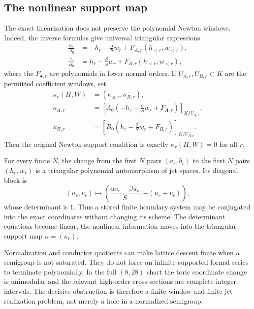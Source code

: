 \subsection{The nonlinear support map}

The exact linearization does not preserve the polynomial Newton windows.
Indeed, the inverse formulas give universal triangular expressions
\begin{align}
\frac{a_r}{A_0}
&=-h_r-\frac{\alpha}{S}w_r
+F_{A,r}(h_{<r},w_{<r}),\label{eq:support-map-A}\\
\frac{b_r}{B_0}
&=h_r-\frac{\beta}{S}w_r
+F_{B,r}(h_{<r},w_{<r}),\label{eq:support-map-B}
\end{align}
where the \(F_{\bullet,r}\) are polynomials in lower normal orders.
If \(U_{A,r},U_{B,r}\subset K\) are the permitted coefficient windows, set
\begin{equation}
\label{eq:support-kuranishi}
\begin{aligned}
\kappa_r(H,W)&=(\kappa_{A,r},\kappa_{B,r}),\\
\kappa_{A,r}
&=\left[
A_0\!\left(-h_r-\frac{\alpha}{S}w_r+F_{A,r}\right)
\right]_{K/U_{A,r}},\\
\kappa_{B,r}
&=\left[
B_0\!\left(h_r-\frac{\beta}{S}w_r+F_{B,r}\right)
\right]_{K/U_{B,r}}.
\end{aligned}
\end{equation}
Then the original Newton-support condition is exactly
\(\kappa_r(H,W)=0\) for all \(r\).

For every finite \(N\), the change from the first \(N\) pairs
\((a_r,b_r)\) to the first \(N\) pairs \((h_r,w_r)\) is a triangular
polynomial automorphism of jet spaces.  Its diagonal block is
\[
(u_r,v_r)\longmapsto
\left(\frac{\alpha v_r-\beta u_r}{S},-(u_r+v_r)\right),
\]
whose determinant is \(1\).  Thus a stored finite boundary system may be
conjugated into the exact coordinates without changing its scheme.  The
determinant equations become linear; the nonlinear information moves into
the triangular support map \(\kappa=(\kappa_r)\).

\begin{remark}
\label{rem:conductor-limitation}
Normalization and conductor quotients can make lattice descent finite when
a semigroup is not saturated.  They do not force an infinite supported
formal series to terminate polynomially.  In the full \((8,28)\) chart the
toric coordinate change is unimodular and the relevant high-order
cross-sections are complete integer intervals.  The decisive obstruction is
therefore a finite-window and finite-jet realization problem, not merely a
hole in a normalized semigroup.
\end{remark}


